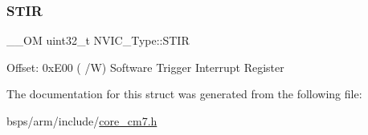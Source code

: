 \subsubsection{\texorpdfstring{STIR}{STIR}}
{\footnotesize\ttfamily \+\_\+\+\_\+\+OM uint32\+\_\+t N\+V\+I\+C\+\_\+\+Type\+::\+S\+T\+IR}

Offset\+: 0x\+E00 ( /W) Software Trigger Interrupt Register 

The documentation for this struct was generated from the following file\+:\begin{DoxyCompactItemize}
\item 
bsps/arm/include/\mbox{\hyperlink{core__cm7_8h}{core\+\_\+cm7.\+h}}\end{DoxyCompactItemize}

